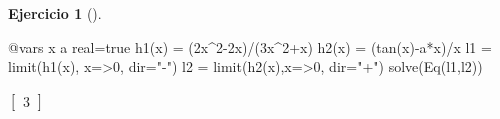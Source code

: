 \documentclass[
  a4paper,
]{scrreport}
\newenvironment{Shaded}{\begin{snugshade}}{\end{snugshade}}
\newcommand{\ConstantTok}[1]{\textcolor[rgb]{0.56,0.35,0.01}{#1}}
\newcommand{\FloatTok}[1]{\textcolor[rgb]{0.68,0.00,0.00}{#1}}
\newcommand{\FunctionTok}[1]{\textcolor[rgb]{0.28,0.35,0.67}{#1}}
\newcommand{\NormalTok}[1]{\textcolor[rgb]{0.00,0.23,0.31}{#1}}
\newcommand{\OperatorTok}[1]{\textcolor[rgb]{0.37,0.37,0.37}{#1}}
\newcommand{\PreprocessorTok}[1]{\textcolor[rgb]{0.68,0.00,0.00}{#1}}
\newcommand{\StringTok}[1]{\textcolor[rgb]{0.13,0.47,0.30}{#1}}
\theoremstyle{definition}
\newtheorem{exercise}{Ejercicio}[chapter]
\theoremstyle{remark}
\begin{document}
\begin{exercise}[]
\begin{tcolorbox}
\begin{Shaded}
\begin{Highlighting}[]
\PreprocessorTok{@vars}\NormalTok{ x a real}\OperatorTok{=}\ConstantTok{true}
\FunctionTok{h1}\NormalTok{(x) }\OperatorTok{=}\NormalTok{ (}\FloatTok{2}\NormalTok{x}\OperatorTok{\^{}}\FloatTok{2}\OperatorTok{{-}}\FloatTok{2}\NormalTok{x)}\OperatorTok{/}\NormalTok{(}\FloatTok{3}\NormalTok{x}\OperatorTok{\^{}}\FloatTok{2}\OperatorTok{+}\NormalTok{x)}
\FunctionTok{h2}\NormalTok{(x) }\OperatorTok{=}\NormalTok{ (}\FunctionTok{tan}\NormalTok{(x)}\OperatorTok{{-}}\NormalTok{a}\OperatorTok{*}\NormalTok{x)}\OperatorTok{/}\NormalTok{x }
\NormalTok{l1 }\OperatorTok{=} \FunctionTok{limit}\NormalTok{(}\FunctionTok{h1}\NormalTok{(x), x}\OperatorTok{=\textgreater{}}\FloatTok{0}\NormalTok{, dir}\OperatorTok{=}\StringTok{"{-}"}\NormalTok{)}
\NormalTok{l2 }\OperatorTok{=} \FunctionTok{limit}\NormalTok{(}\FunctionTok{h2}\NormalTok{(x),x}\OperatorTok{=\textgreater{}}\FloatTok{0}\NormalTok{, dir}\OperatorTok{=}\StringTok{"+"}\NormalTok{)}
\FunctionTok{solve}\NormalTok{(}\FunctionTok{Eq}\NormalTok{(l1,l2))}
\end{Highlighting}
\end{Shaded}

$\left[ \begin{array}{r}3\end{array} \right]$

\end{tcolorbox}

\end{exercise}
\end{document}
